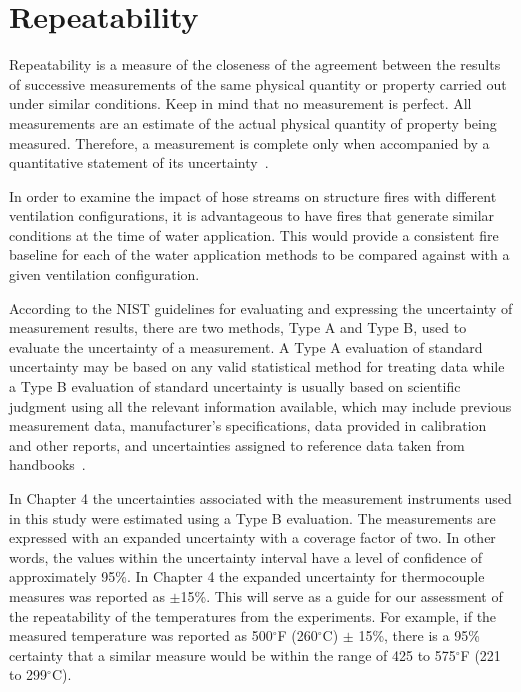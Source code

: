 \documentclass[12pt,oneside]{book}
\begin{document}
\section{Repeatability}

Repeatability is a measure of the closeness of the agreement between the results of successive measurements of the same physical quantity or property carried out under similar conditions. Keep in mind that no measurement is perfect.  All measurements are an estimate of the actual physical quantity of property being measured. Therefore, a measurement is complete only when accompanied by a quantitative statement of its uncertainty~\cite{Taylor&Kuyatt:1994}. 

In order to examine the impact of hose streams on structure fires with different ventilation configurations, it is advantageous to have fires that generate similar conditions at the time of water application.  This would provide a consistent fire baseline for each of the water application methods to be compared against with a given ventilation configuration.

According to the NIST guidelines for evaluating and expressing the uncertainty of measurement results, there are two methods, Type A and Type B, used to evaluate the uncertainty of a measurement.  A Type A evaluation of standard uncertainty may be based on any valid statistical method for treating data while a Type B evaluation of standard uncertainty is usually based on scientific judgment using all the relevant information available, which may include previous measurement data, manufacturer's specifications, data provided in calibration and other reports, and uncertainties assigned to reference data taken from handbooks~\cite{Taylor&Kuyatt:1994}.     

In Chapter 4 the uncertainties associated with the measurement instruments used in this study were estimated using a Type B evaluation. The measurements are expressed with an expanded uncertainty with a coverage factor of two.  In other words, the values within the uncertainty interval have a level of confidence of approximately 95\%.  In Chapter 4 the expanded uncertainty for thermocouple measures was reported as $\pm$15\%. This will serve as a guide for our assessment of the repeatability of the temperatures from the experiments. For example, if the measured temperature was reported as 500$^\circ$F (260$^\circ$C) $\pm$ 15\%, there is a 95\% certainty that a similar measure would be within the range of 425 to 575$^\circ$F (221 to 299$^\circ$C).  
\end{document}
